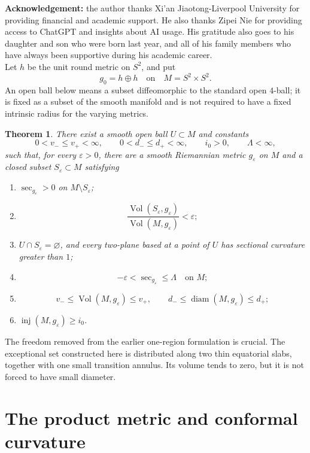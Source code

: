 \documentclass[11pt]{amsart}
\newtheorem{theorem}{Theorem}[section]
\theoremstyle{definition}
\newcommand{\Vol}{\operatorname{Vol}}
\newcommand{\inj}{\operatorname{inj}}
\newcommand{\diam}{\operatorname{diam}}
\begin{document}
\textbf{Acknowledgement:} the author thanks Xi'an Jiaotong-Liverpool University for providing financial and academic support. He also thanks Zipei Nie for providing access to ChatGPT and insights about AI usage. His gratitude also goes to his daughter and son who were born last year, and all of his family members who have always been supportive during his academic career.\\


Let $h$ be the unit round metric on $S^2$, and put
\[
 g_0=h\oplus h
 \quad\text{on}\quad
 M=S^2\times S^2.
\]
An open ball below means a subset diffeomorphic to the standard open $4$-ball; it is fixed as a subset of the smooth manifold and is not required to have a fixed intrinsic radius for the varying metrics.

\begin{theorem}\label{thm:main}
There exist a smooth open ball $U\subset M$ and constants
\[
 0<v_-\le v_+<\infty,\qquad
 0<d_-\le d_+<\infty,\qquad
 i_0>0,\qquad \Lambda<\infty,
\]
such that, for every $\varepsilon>0$, there are a smooth Riemannian metric $g_\varepsilon$ on $M$ and a closed subset $S_\varepsilon\subset M$ satisfying
\begin{enumerate}[label=\textup{(\arabic*)}]
 \item $\sec_{g_\varepsilon}>0$ on $M\setminus S_\varepsilon$;
 \item
 \[
  \frac{\Vol(S_\varepsilon,g_\varepsilon)}
       {\Vol(M,g_\varepsilon)}<\varepsilon;
 \]
 \item $U\cap S_\varepsilon=\varnothing$, and every two-plane based at a point of $U$ has sectional curvature greater than $1$;
 \item
 \[
  -\varepsilon<\sec_{g_\varepsilon}\le\Lambda
  \quad\text{on }M;
 \]
 \item
 \[
  v_-\le\Vol(M,g_\varepsilon)\le v_+,
  \qquad
  d_-\le\diam(M,g_\varepsilon)\le d_+;
 \]
 \item $\inj(M,g_\varepsilon)\ge i_0$.
\end{enumerate}
\end{theorem}

The freedom removed from the earlier one-region formulation is crucial.  The exceptional set constructed here is distributed along two thin equatorial slabs, together with one small transition annulus.  Its volume tends to zero, but it is not forced to have small diameter.

\section{The product metric and conformal curvature}
\end{document}
